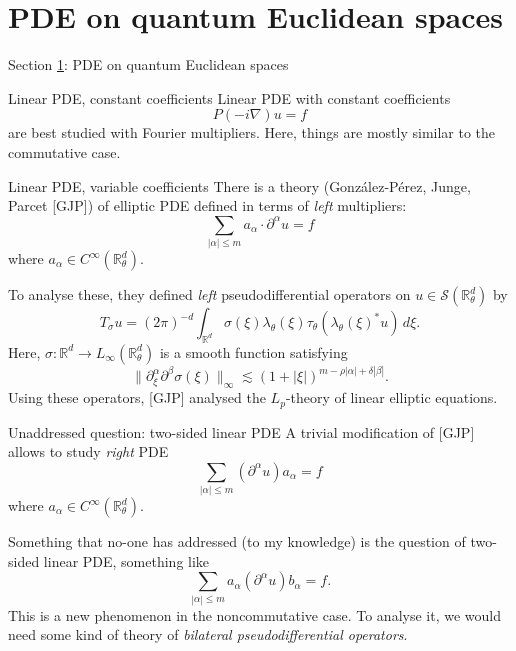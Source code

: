 \documentclass{beamer}
\numberwithin{equation}{section}
\theoremstyle{plain}
\theoremstyle{plain}
\theoremstyle{definition}
\theoremstyle{plain}
\theoremstyle{plain}
\theoremstyle{definition}
\newcommand{\Rl}{\mathbb{R}}
\newcommand{\Sc}{\mathcal{S}}
\begin{document}
\section{PDE on quantum Euclidean spaces}\label{pde_section}

\begin{frame}
    \Huge{Section \ref{pde_section}: PDE on quantum Euclidean spaces}
\end{frame}

\begin{frame}{Linear PDE, constant coefficients}
    Linear PDE with constant coefficients
    \[
        P(-i\nabla)u = f
    \]
    are best studied with Fourier multipliers. Here, things are mostly similar to the commutative case.
\end{frame}

\begin{frame}{Linear PDE, variable coefficients}
    There is a theory (Gonz\'{a}lez-P\'{e}rez, Junge, Parcet [GJP]) of elliptic PDE defined in terms of \emph{left} multipliers:
    \[
        \sum_{|\alpha|\leq m} a_{\alpha} \cdot \partial^{\alpha}u = f
    \]
    where $a_{\alpha}\in C^\infty(\Rl^d_\theta).$

    \pause To analyse these, they defined \emph{left} pseudodifferential operators on $u\in \Sc(\Rl^d_\theta)$ by
    \[
        T_{\sigma}u = (2\pi)^{-d}\int_{\Rl^d} \sigma(\xi)\lambda_\theta(\xi)\tau_\theta(\lambda_\theta(\xi)^*u)\,d\xi.
    \]
    Here, $\sigma:\Rl^d\to L_{\infty}(\Rl^d_\theta)$ is a smooth function satisfying
    \[
        \|\partial_{\xi}^{\alpha}\partial^\beta \sigma(\xi)\|_{\infty} \lesssim (1+|\xi|)^{m-\rho|\alpha|+\delta |\beta|}.
    \]
    \pause
    Using these operators, [GJP] analysed the $L_p$-theory of linear elliptic equations.
\end{frame}

\begin{frame}{Unaddressed question: two-sided linear PDE}
    A trivial modification of [GJP] allows to study \emph{right} PDE
    \[
        \sum_{|\alpha|\leq m} (\partial^{\alpha}u)a_{\alpha} = f
    \]
    where $a_{\alpha}\in C^\infty(\Rl^d_\theta).$

    Something that no-one has addressed (to my knowledge) is the question of two-sided linear PDE, something like
    \[
        \sum_{|\alpha|\leq m} a_{\alpha}(\partial^{\alpha}u)b_{\alpha} = f.
    \]
    This is a new phenomenon in the noncommutative case.\pause
    To analyse it, we would need some kind of theory of \emph{bilateral pseudodifferential operators}.
\end{frame}
\end{document}

